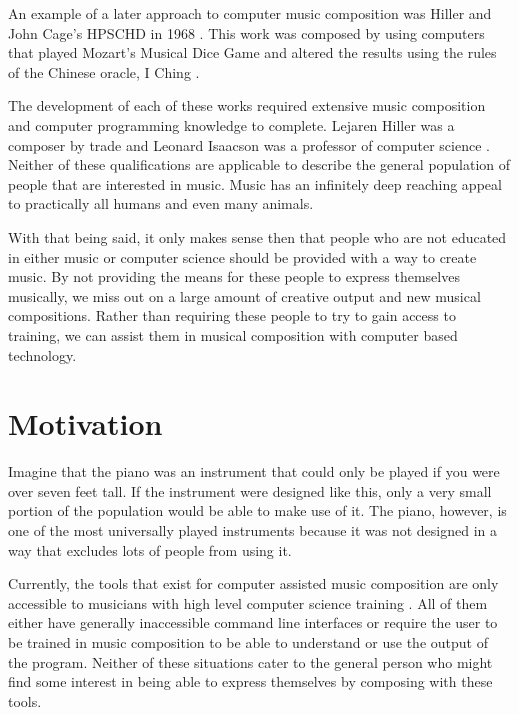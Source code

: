 An example of a later approach to computer music composition was Hiller and John Cage's HPSCHD in 1968 \cite{Brit_2018}.  This work was composed by using computers that played Mozart's Musical Dice Game and altered the results using the rules of the Chinese oracle, I Ching \cite{Brit_2018}.

\vspace{\baselineskip}

The development of each of these works required extensive music composition and computer programming knowledge to complete.  Lejaren Hiller was a composer by trade and Leonard Isaacson was a professor of computer science \cite{Brit_2018}.  Neither of these qualifications are applicable to describe the general population of people that are interested in music.  Music has an infinitely deep reaching appeal to practically all humans and even many animals.

\vspace{\baselineskip}

With that being said, it only makes sense then that people who are not educated in either music or computer science should be provided with a way to create music.  By not providing the means for these people to express themselves musically, we miss out on a large amount of creative output and new musical compositions.  Rather than requiring these people to try to gain access to training, we can assist them in musical composition with computer based technology.

\section{Motivation} 
\label{sec:motivation}

Imagine that the piano was an instrument that could only be played if you were over seven feet tall.  If the instrument were designed like this, only a very small portion of the population would be able to make use of it.  The piano, however, is one of the most universally played instruments because it was not designed in a way that excludes lots of people from using it.

\vspace{\baselineskip}

Currently, the tools that exist for computer assisted music composition are only accessible to musicians with high level computer science training \cite{Teymuri_2019}.  All of them either have generally inaccessible command line interfaces or require the user to be trained in music composition to be able to understand or use the output of the program.  Neither of these situations cater to the general person who might find some interest in being able to express themselves by composing with these tools.

